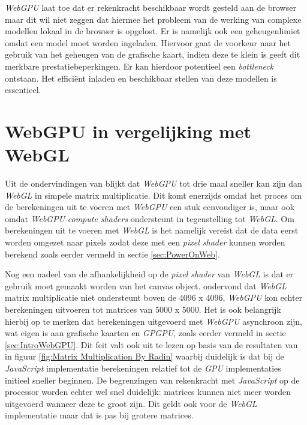 \bigbreak{}

\textit{WebGPU} laat toe dat er rekenkracht beschikbaar wordt gesteld aan de browser maar dit wil niet zeggen dat hiermee het probleem van de werking van complexe modellen lokaal in de browser is opgelost. Er is namelijk ook een geheugenlimiet omdat een model moet worden ingeladen. Hiervoor gaat de voorkeur naar het gebruik van het geheugen van de grafische kaart, indien deze te klein is geeft dit merkbare prestatiebeperkingen. Er kan hierdoor potentieel een \textit{bottleneck} ontstaan. Het efficiënt inladen en beschikbaar stellen van deze modellen is essentieel.

\section{WebGPU in vergelijking met WebGL}

Uit de ondervindingen van \textcite{Radin2021} blijkt dat \textit{WebGPU} tot drie maal sneller kan zijn dan \textit{WebGL} in simpele matrix multiplicatie. Dit komt enerzijds omdat het proces om de berekeningen uit te voeren met \textit{WebGPU} een stuk eenvoudiger is, maar ook omdat \textit{WebGPU} \textit{compute shaders} ondersteunt in tegenstelling tot \textit{WebGL}. Om berekeningen uit te voeren met \textit{WebGL} is het namelijk vereist dat de data eerst worden omgezet naar pixels zodat deze met een \textit{pixel shader} kunnen worden berekend zoals eerder vermeld in sectie \ref{sec:PowerOnWeb}. 

\bigbreak{}

Nog een nadeel van de afhankelijkheid op de \textit{pixel shader} van \textit{WebGL} is dat er gebruik moet gemaakt worden van het canvas object. \textcite{Radin2021} ondervond dat \textit{WebGL} matrix multiplicatie niet ondersteunt boven de 4096 x 4096, \textit{WebGPU} kon echter berekeningen uitvoeren tot matrices van 5000 x 5000. Het is ook belangrijk hierbij op te merken dat berekeningen uitgevoerd met \textit{WebGPU} asynchroon zijn, wat eigen is aan grafische kaarten en \textit{GPGPU}, zoals eerder vermeld in sectie \ref{sec:IntroWebGPU}. Dit feit valt ook uit te lezen op basis van de resultaten van \textcite{Radin2021} in figuur \ref{fig:Matrix Multiplication By Radin} waarbij duidelijk is dat bij de \textit{JavaScript} implementatie berekeningen relatief tot de \textit{GPU} implementaties initieel sneller beginnen. De begrenzingen van rekenkracht met \textit{JavaScript} op de processor worden echter wel snel duidelijk: matrices kunnen niet meer worden uitgevoerd wanneer deze te groot zijn. Dit geldt ook voor de \textit{WebGL} implementatie maar dat is pas bij grotere matrices.

